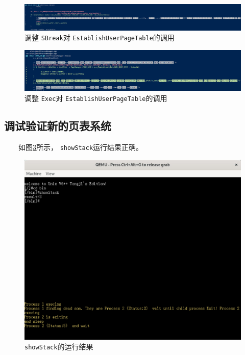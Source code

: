 \begin{figure}[!htbp]
    \centering
    \includegraphics[width=\textwidth]{images/SBreak.png}
    \caption{调整 \texttt{SBreak}对 \texttt{EstablishUserPageTable}的调用}\label{SBtack}
\end{figure}

\begin{figure}[!htbp]
    \centering
    \includegraphics[width=\textwidth]{images/Exec.png}
    \caption{调整 \texttt{Exec}对 \texttt{EstablishUserPageTable}的调用}\label{Exec}
\end{figure}

\clearpage
\subsection{调试验证新的页表系统}

　　如图\ref{3}所示， \texttt{showStack}运行结果正确。

\begin{figure}[!htbp]
    \centering
    \includegraphics[width=\textwidth]{images/3.png}
    \caption{\texttt{showStack}的运行结果}\label{3}
\end{figure}

